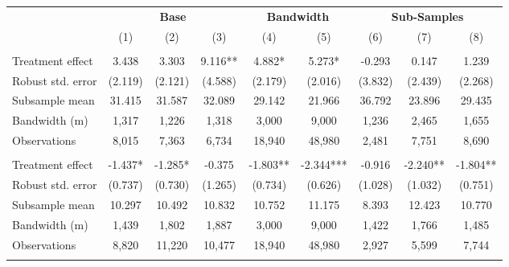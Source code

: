 
\begin{tabular}{lcccccccc}
\toprule
\multicolumn{1}{c}{\textbf{ }} & \multicolumn{3}{c}{\textbf{Base}} & \multicolumn{2}{c}{\textbf{Bandwidth}} & \multicolumn{3}{c}{\textbf{Sub-Samples}} \\
\cmidrule(l{3pt}r{3pt}){2-4} \cmidrule(l{3pt}r{3pt}){5-6} \cmidrule(l{3pt}r{3pt}){7-9}
  & (1) & (2) & (3) & (4) & (5) & (6) & (7) & (8)\\
\midrule
\addlinespace[0.3em]
\multicolumn{9}{l}{\textit{\textbf{Panel A: Deforestation (\%)}}}\\
\hspace{1em}Treatment effect & 3.438 & 3.303 & 9.116** & 4.882* & 5.273* & -0.293 & 0.147 & 1.239\\
\hspace{1em}Robust std. error & (2.119) & (2.121) & (4.588) & (2.179) & (2.016) & (3.832) & (2.439) & (2.268)\\
\hspace{1em}Subsample mean & 31.415 & 31.587 & 32.089 & 29.142 & 21.966 & 36.792 & 23.896 & 29.435\\
\hspace{1em}Bandwidth (m) & 1,317 & 1,226 & 1,318 & 3,000 & 9,000 & 1,236 & 2,465 & 1,655\\
\hspace{1em}Observations & 8,015 & 7,363 & 6,734 & 18,940 & 48,980 & 2,481 & 7,751 & 8,690\\
\addlinespace[0.3em]
\multicolumn{9}{l}{\textit{\textbf{Panel B: Degradation (\%)}}}\\
\hspace{1em}Treatment effect & -1.437* & -1.285* & -0.375 & -1.803** & -2.344*** & -0.916 & -2.240** & -1.804**\\
\hspace{1em}Robust std. error & (0.737) & (0.730) & (1.265) & (0.734) & (0.626) & (1.028) & (1.032) & (0.751)\\
\hspace{1em}Subsample mean & 10.297 & 10.492 & 10.832 & 10.752 & 11.175 & 8.393 & 12.423 & 10.770\\
\hspace{1em}Bandwidth (m) & 1,439 & 1,802 & 1,887 & 3,000 & 9,000 & 1,422 & 1,766 & 1,485\\
\hspace{1em}Observations & 8,820 & 11,220 & 10,477 & 18,940 & 48,980 & 2,927 & 5,599 & 7,744\\
\addlinespace[0.3em]
\multicolumn{9}{l}{\textbf{Model specifications}}\\

\end{tabular}
